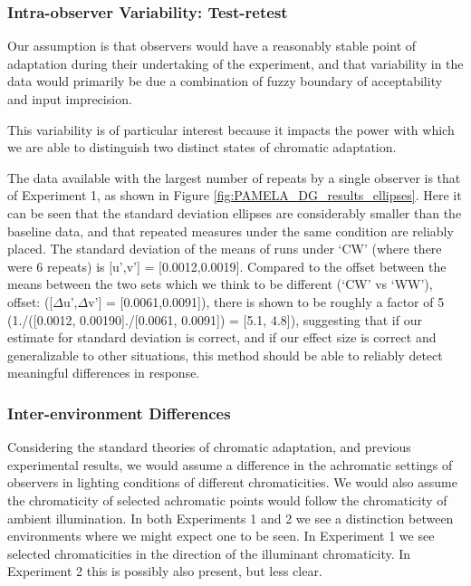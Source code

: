 \subsubsection{Intra-observer Variability: Test-retest}

Our assumption is that observers would have a reasonably stable point of adaptation during their undertaking of the experiment, and that variability in the data would primarily be due a combination of fuzzy boundary of acceptability and input imprecision. 

This variability is of particular interest because it impacts the power with which we are able to distinguish two distinct states of chromatic adaptation.

The data available with the largest number of repeats by a single observer is that of Experiment 1, as shown in Figure \ref{fig:PAMELA_DG_results_ellipses}. Here it can be seen that the standard deviation ellipses are considerably smaller than the baseline data, and that repeated measures under the same condition are reliably placed. The standard deviation of the means of runs under `CW' (where there were 6 repeats) is [u',v'] = [0.0012,0.0019]. Compared to the offset between the means between the two sets which we think to be different (`CW' vs `WW'), offset: ([$\Delta$u',$\Delta$v'] = [0.0061,0.0091]), there is shown to be roughly a factor of 5 (1./([0.0012, 0.00190]./[0.0061, 0.0091]) = [5.1, 4.8]), suggesting that if our estimate for standard deviation is correct, and if our effect size is correct and generalizable to other situations, this method should be able to reliably detect meaningful differences in response.

\subsubsection{Inter-environment Differences}

Considering the standard theories of chromatic adaptation, and previous experimental results, we would assume a difference in the achromatic settings of observers in lighting conditions of different chromaticities. We would also assume the chromaticity of selected achromatic points would follow the chromaticity of ambient illumination. In both Experiments 1 and 2 we see a distinction between environments where we might expect one to be seen. In Experiment 1 we see selected chromaticities in the direction of the illuminant chromaticity. In Experiment 2 this is possibly also present, but less clear.


